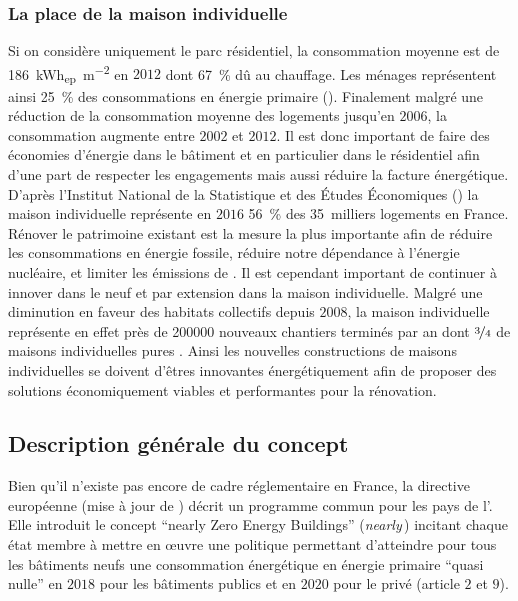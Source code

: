 \subsubsection{La place de la maison individuelle} %
\label{ssub:la_place_de_la_maison_individuelle}
Si on considère uniquement le parc résidentiel, la consommation moyenne
est de \SI{186}{\kWh_{ep}\per\metre\squared} en $2012$ dont \SI{67}{\percent} dû
au chauffage. Les ménages représentent ainsi \SI{25}{\percent} des consommations
en énergie primaire (). Finalement malgré
une réduction de la consommation moyenne des logements jusqu’en $2006$, la
consommation augmente entre $2002$ et $2012$. Il est donc important
de faire des économies d’énergie dans le bâtiment et en particulier dans le résidentiel
afin d’une part de respecter les engagements mais aussi réduire la facture énergétique.
D’après l’Institut National de la Statistique et des Études Économiques ()
la maison individuelle représente en $2016$ \SI{56}{\percent} des \SI{35}{milliers}
logements en France.
Rénover le patrimoine existant est la mesure la plus importante afin de réduire
les consommations en énergie fossile, réduire notre dépendance à l’énergie nucléaire,
et limiter les émissions de . Il est cependant important de continuer à
innover dans le neuf et par extension dans la maison individuelle.
Malgré une diminution en faveur des habitats collectifs depuis $2008$, la maison individuelle
représente en effet près de \num{200000} nouveaux chantiers terminés par an dont $\nicefrac{3}{4}$
de maisons individuelles pures \parencite{Caicedo2015}.
Ainsi les nouvelles constructions de maisons individuelles se doivent d’êtres innovantes
énergétiquement afin de proposer des solutions économiquement viables et performantes
pour la rénovation.



\subsection{Description générale du concept} %
\label{sub:description_generale_du_concept}

Bien qu’il n’existe pas encore de cadre réglementaire en France,
la directive européenne  \parencite{EPBD2010} (mise à jour de \textcite{EPBD2002})
décrit un programme commun pour les pays de l’.
Elle introduit le concept \enquote{nearly Zero Energy Buildings}
(\textit{nearly}\,) incitant chaque état membre à mettre en
œuvre une politique permettant d’atteindre pour tous les bâtiments neufs une consommation
énergétique en énergie primaire \enquote{quasi nulle} en $2018$ pour les bâtiments publics
et en $2020$ pour le privé (article $2$ et $9$).

